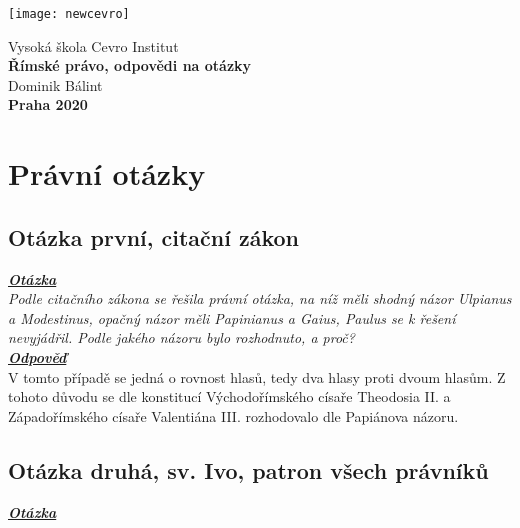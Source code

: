 \documentclass{article}
\begin{document}
  \thispagestyle{empty}
  \begin{center}
  \texttt{[image: newcevro]} \\
  \end{center}
  \vspace{15mm}
  \begin{center}
  {\Large Vysoká škola Cevro Institut} \\
  \vspace{15mm}
  {\Large \textbf{Římské právo, odpovědi na otázky}} \\
  \vspace{15mm}
  {\Large Dominik Bálint} \\
  \vspace{49mm}
  {\Large \textbf{Praha 2020}} \\
  \end{center}

\newpage
  \thispagestyle{Contents}
  \tableofcontents
  
\newpage
{}
\section{Právní otázky}  

\subsection{Otázka první, citační zákon}
\textbf{\textit{\underline{Otázka}}}\\

\indent\textit{Podle citačního zákona se řešila právní otázka, na níž měli shodný názor Ulpianus a Modestinus, opačný názor měli Papinianus a Gaius, Paulus se k řešení nevyjádřil. Podle jakého názoru bylo rozhodnuto, a proč?}\\

\noindent\textbf{\textit{\underline{Odpověď}}}\\

\indent V tomto případě se jedná o rovnost hlasů, tedy dva hlasy proti dvoum hlasům. Z tohoto důvodu se dle konstitucí Východořímského císaře Theodosia II. a Západořímského císaře Valentiána III. rozhodovalo dle Papiánova názoru.

\subsection{Otázka druhá, sv. Ivo, patron všech právníků}
\textbf{\textit{\underline{Otázka}}}\\
\end{document}
